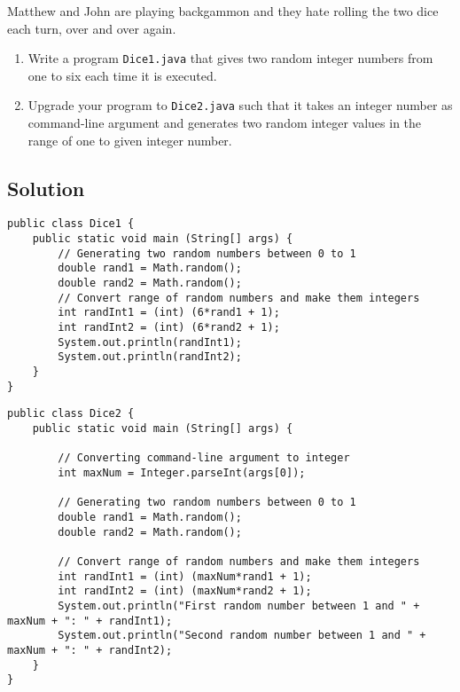 \documentclass[12pt,letterpaper,twoside]{article}
\begin{document}
Matthew and John are playing backgammon and they hate rolling the two dice each turn, over and over again.

\begin{enumerate}
	\item Write a program \texttt{Dice1.java} that gives two random integer numbers from one to six each time it is executed.
	\item Upgrade your program to \texttt{Dice2.java} such that it takes an integer number as command-line argument and generates two random integer values in the range of one to given integer number.
\end{enumerate}

\subsection*{Solution}

\begin{lstlisting}
public class Dice1 {
	public static void main (String[] args) {
		// Generating two random numbers between 0 to 1
		double rand1 = Math.random();
		double rand2 = Math.random();
		// Convert range of random numbers and make them integers
		int randInt1 = (int) (6*rand1 + 1);
		int randInt2 = (int) (6*rand2 + 1);
		System.out.println(randInt1);
		System.out.println(randInt2);
	}
}
\end{lstlisting}
\begin{lstlisting}
public class Dice2 {
	public static void main (String[] args) {

		// Converting command-line argument to integer
		int maxNum = Integer.parseInt(args[0]);

		// Generating two random numbers between 0 to 1
		double rand1 = Math.random();
		double rand2 = Math.random();

		// Convert range of random numbers and make them integers
		int randInt1 = (int) (maxNum*rand1 + 1);
		int randInt2 = (int) (maxNum*rand2 + 1);
		System.out.println("First random number between 1 and " + maxNum + ": " + randInt1);
		System.out.println("Second random number between 1 and " + maxNum + ": " + randInt2);
	}
}
\end{lstlisting}
\end{document}
